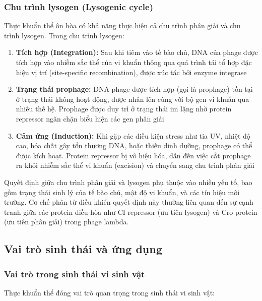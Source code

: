 \subsubsection{Chu trình lysogen (Lysogenic cycle)}

Thực khuẩn thể ôn hòa có khả năng thực hiện cả chu trình phân giải và chu trình lysogen. Trong chu trình lysogen:

\begin{enumerate}
    \item \textbf{Tích hợp (Integration):} Sau khi tiêm vào tế bào chủ, DNA của phage được tích hợp vào nhiễm sắc thể của vi khuẩn thông qua quá trình tái tổ hợp đặc hiệu vị trí (site-specific recombination), được xúc tác bởi enzyme integrase

    \item \textbf{Trạng thái prophage:} DNA phage được tích hợp (gọi là prophage) tồn tại ở trạng thái không hoạt động, được nhân lên cùng với bộ gen vi khuẩn qua nhiều thế hệ. Prophage được duy trì ở trạng thái im lặng nhờ protein repressor ngăn chặn biểu hiện các gen phân giải

    \item \textbf{Cảm ứng (Induction):} Khi gặp các điều kiện stress như tia UV, nhiệt độ cao, hóa chất gây tổn thương DNA, hoặc thiếu dinh dưỡng, prophage có thể được kích hoạt. Protein repressor bị vô hiệu hóa, dẫn đến việc cắt prophage ra khỏi nhiễm sắc thể vi khuẩn (excision) và chuyển sang chu trình phân giải
\end{enumerate}

Quyết định giữa chu trình phân giải và lysogen phụ thuộc vào nhiều yếu tố, bao gồm trạng thái sinh lý của tế bào chủ, mật độ vi khuẩn, và các tín hiệu môi trường. Cơ chế phân tử điều khiển quyết định này thường liên quan đến sự cạnh tranh giữa các protein điều hòa như CI repressor (ưu tiên lysogen) và Cro protein (ưu tiên phân giải) trong phage lambda.

\subsection{Vai trò sinh thái và ứng dụng}

\subsubsection{Vai trò trong sinh thái vi sinh vật}

Thực khuẩn thể đóng vai trò quan trọng trong sinh thái vi sinh vật:

